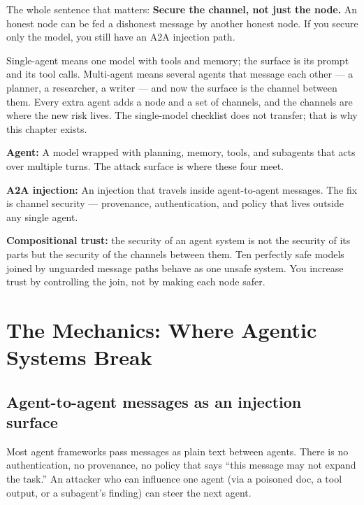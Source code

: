 The whole sentence that matters: \textbf{Secure the channel, not just the node.} An honest node can be fed a dishonest message by another honest node. If you secure only the model, you still have an A2A injection path.

Single-agent means one model with tools and memory; the surface is its prompt and its tool calls. Multi-agent means several agents that message each other — a planner, a researcher, a writer — and now the surface is the channel between them. Every extra agent adds a node and a set of channels, and the channels are where the new risk lives. The single-model checklist does not transfer; that is why this chapter exists.

\begin{defbox}
\textbf{Agent:} A model wrapped with planning, memory, tools, and subagents that acts over multiple turns. The attack surface is where these four meet.
\end{defbox}

\begin{defbox}
\textbf{A2A injection:} An injection that travels inside agent-to-agent messages. The fix is channel security — provenance, authentication, and policy that lives outside any single agent.
\end{defbox}

\begin{defbox}
\textbf{Compositional trust:} the security of an agent system is not the security of its parts but the security of the channels between them. Ten perfectly safe models joined by unguarded message paths behave as one unsafe system. You increase trust by controlling the join, not by making each node safer.
\end{defbox}

\section{The Mechanics: Where Agentic Systems Break}
\tierP

\subsection{Agent-to-agent messages as an injection surface}
Most agent frameworks pass messages as plain text between agents. There is no authentication, no provenance, no policy that says ``this message may not expand the task.'' An attacker who can influence one agent (via a poisoned doc, a tool output, or a subagent's finding) can steer the next agent.

